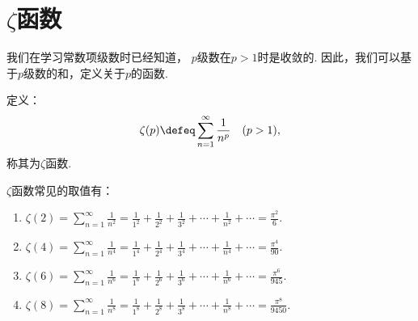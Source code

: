 \section{\texorpdfstring{\(\zeta\)}{\textzeta}函数}
我们在学习常数项级数时已经知道，
\(p\)级数在\(p>1\)时是收敛的.
因此，我们可以基于\(p\)级数的和，定义关于\(p\)的函数.
\begin{definition}
定义：\[
	\zeta(p)
	\defeq
	\sum_{n=1}^\infty \frac{1}{n^p}
	\quad(p>1),
\]
称其为\(\zeta\)函数.
\end{definition}

\begin{proposition}
\def\zetafunc#1{\zeta(#1)%
	= \sum_{n=1}^\infty \frac{1}{n^{#1}}%
	= \frac{1}{1^{#1}}%
		+\frac{1}{2^{#1}}%
		+\frac{1}{3^{#1}}%
		+\dotsb%
		+\frac{1}{n^{#1}}%
		+\dotsb}%
\(\zeta\)函数常见的取值有：\begin{enumerate}
	\item \(\zetafunc{2} = \frac{\pi^2}{6}\).
	\item \(\zetafunc{4} = \frac{\pi^4}{90}\).
	\item \(\zetafunc{6} = \frac{\pi^6}{945}\).
	\item \(\zetafunc{8} = \frac{\pi^8}{9450}\).
\end{enumerate}
\end{proposition}
